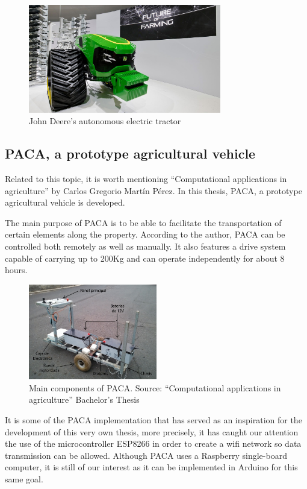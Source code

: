 \begin{figure}[htp]
    \centering
    \includegraphics[width=0.75\textwidth]{fig/deere-tractor.jpg}
    \caption{John Deere’s autonomous electric tractor}
    \label{fig:deere-tractor}
\end{figure}

\subsection{PACA, a prototype agricultural vehicle}
Related to this topic, it is worth mentioning ``Computational applications in agriculture'' \cite{paca} by Carlos Gregorio Martín Pérez. In this thesis, PACA, a prototype agricultural vehicle is developed.

The main purpose of PACA is to be able to facilitate the transportation of certain elements along the property. According to the author, PACA can be controlled both remotely as well as manually. It also features a drive system capable of carrying up to 200Kg and can operate independently for about 8 hours.

\begin{figure}[htp]
    \centering
    \includegraphics[width=0.5\textwidth]{fig/paca.png}
    \caption{Main components of PACA. Source: ``Computational applications in agriculture'' Bachelor's Thesis}
    \label{fig:paca}
\end{figure}

 It is some of the PACA implementation that has served as an inspiration for the development of this very own thesis, more precisely, it has caught our attention the use of the microcontroller ESP8266 in order to create a wifi network so data transmission can be allowed. Although PACA uses a Raspberry single-board computer, it is still of our interest as it can be implemented in Arduino for this same goal.

